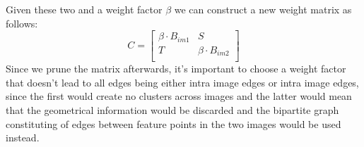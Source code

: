 \documentclass{article}
\begin{document}
%
Given these two and a weight factor $\beta$ we can construct a new 
weight matrix as follows:
%
$$C=
\begin{bmatrix}
\beta \cdot B_{im1} & S       \\
T       & \beta \cdot B_{im2} \\
\end{bmatrix}
$$
%
Since we prune the matrix afterwards, it's important to choose a weight 
factor that doesn't lead to all edges being either intra image edges or 
intra image edges, since the first would create no clusters across 
images and the latter would mean that the geometrical information would 
be discarded and the bipartite graph constituting of edges between 
feature points in the two images would be used instead.



\end{document}
